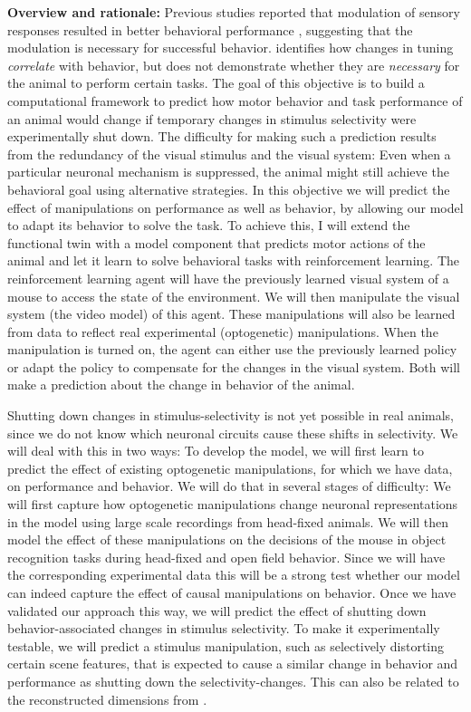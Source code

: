 \documentclass[B2,COG]{ercgrant}
\begin{document}
\textbf{Overview and rationale:} 
Previous studies reported that modulation of sensory responses resulted in better behavioral performance \parencite{Spitzer1988-kq, Bennett2013-rk, Dadarlat2017-jw, De_Gee2022-ir}, suggesting that the modulation is necessary for successful behavior. 
 identifies how changes in tuning \textit{correlate} with behavior, but does not demonstrate whether they are \textit{necessary} for the animal to perform certain tasks.
The goal of this objective is to build a computational framework to predict how motor behavior and task performance of an animal would change if temporary changes in stimulus selectivity were experimentally shut down.  
The difficulty for making such a prediction results from the redundancy of the visual stimulus and the visual system: 
Even when a particular neuronal mechanism is suppressed, the animal might still achieve the behavioral goal using alternative strategies.
In this objective we will predict the effect of manipulations on performance as well as behavior, by allowing our model to adapt its behavior to solve the task. 
To achieve this, I will extend the functional twin with a model component that predicts motor actions of the animal and let it learn to solve behavioral tasks with reinforcement learning.
The reinforcement learning agent will have the previously learned visual system of a mouse to access the state of the environment.
We will then manipulate the visual system (the video model) of this agent. 
These manipulations will also be learned from data to reflect real experimental (optogenetic) manipulations.
When the manipulation is turned on, the agent can either use the previously learned policy or adapt the policy to compensate for the changes in the visual system.
Both will make a prediction about the change in behavior of the animal. 

Shutting down changes in stimulus-selectivity is not yet possible in real animals, since we do not know which neuronal circuits cause these shifts in selectivity.
We will deal with this in two ways:  To develop the model, we will first learn to predict the effect of existing optogenetic manipulations, for which we have data, on performance and behavior.
We will do that in several stages of difficulty: We will first capture how optogenetic manipulations change neuronal representations in the model using large scale recordings from head-fixed animals. 
We will then model the effect of these manipulations on the decisions of the mouse in object recognition tasks during head-fixed and open field behavior. 
Since we will have the corresponding experimental data this will be a strong test whether our model can indeed capture the effect of causal manipulations on behavior.
Once we have validated our approach this way, we will predict the effect of shutting down behavior-associated changes in stimulus selectivity.
 To make it experimentally testable, we will predict a stimulus manipulation, such as selectively distorting certain scene features, that is expected to cause a similar change in behavior and performance as shutting down the selectivity-changes.
This can also be related to the reconstructed dimensions from .
\end{document}
